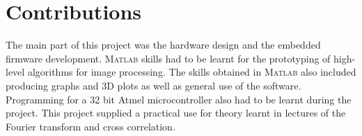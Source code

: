 \section{Contributions}
The main part of this project was the hardware design and the embedded firmware development. \textsc{Matlab} skills had to be learnt for the prototyping of high-level algorithms for image processing. The skills obtained in \textsc{Matlab} also included producing graphs and 3D plots as well as general use of the software. Programming for a 32 bit Atmel microcontroller also had to be learnt during the project. This project supplied a practical use for theory learnt in lectures of the Fourier transform and cross correlation. 
